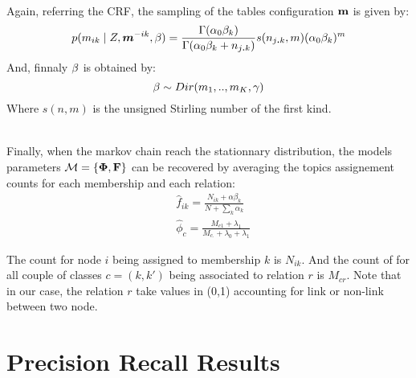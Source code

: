 ~\\
Again, referring the CRF, the sampling of the tables configuration $\mathbf{m}$ is given by: 
\begin{equation}
p(m_{ik} \mid Z, \bm{m}^{-ik}, \mathbf{\beta} ) = \frac{\Gamma(\alpha_0 \beta_k)}{\Gamma(\alpha_0 \beta_k + n_{j\bm{.   }k})} s(n_{j\bm{.}k}, m) (\alpha_0 \beta_k)^m
\end{equation}
And, finnaly  $\mathbf{\beta}$ is obtained by:
\begin{equation}
\mathbf{\beta} \sim Dir(m_1,.., m_K, \gamma)  
\end{equation}
Where $s(n,m)$ is the unsigned Stirling number of the first kind.


~\\
Finally, when the markov chain reach the stationnary distribution, the models parameters $\mathcal{M} = \{\mathbf{\Phi}, \mathbf{F}\}$ can be recovered by averaging the topics assignement counts for each membership and each relation:
\begin{align}
&\hat f_{ik} =\frac{ N_{ik} + \alpha\beta_k}{ N + \sum_k\alpha_k }\\
&\hat \phi_c  = \frac{M_{c1} + \lambda_1}{M_{c\bm{.}} + \lambda_0 + \lambda_1}
\end{align}


The count for node $i$ being assigned to membership $k$ is $N_{ik}$. And the count of for all couple of classes $c=(k,k')$ being associated to relation $r$ is $M_{cr}$. Note that in our case, the relation $r$ take values in (0,1) accounting for link or non-link between two node.

\section{Precision Recall Results}
\label{sec:precision_recall}


